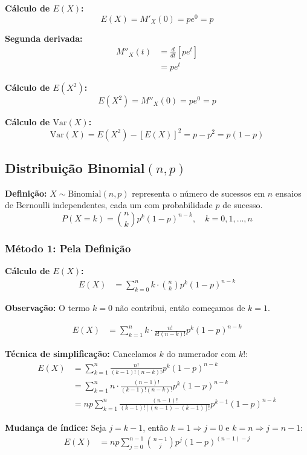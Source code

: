 \documentclass[12pt,a4paper]{article}
\theoremstyle{plain}
\theoremstyle{definition}
\theoremstyle{remark}
\begin{document}
\textbf{Cálculo de \(E(X)\):}
\[
E(X) = M'_X(0) = p e^0 = p
\]

\textbf{Segunda derivada:}
\begin{align}
M''_X(t) &= \frac{d}{dt}[p e^t] \\
&= p e^t
\end{align}

\textbf{Cálculo de \(E(X^2)\):}
\[
E(X^2) = M''_X(0) = p e^0 = p
\]

\textbf{Cálculo de \(\text{Var}(X)\):}
\[
\text{Var}(X) = E(X^2) - [E(X)]^2 = p - p^2 = p(1-p)
\]

\subsection{Distribuição Binomial\((n, p)\)}

\textbf{Definição:} \(X \sim \text{Binomial}(n, p)\) representa o número de sucessos em \(n\) ensaios de Bernoulli independentes, cada um com probabilidade \(p\) de sucesso.
\[
P(X = k) = \binom{n}{k} p^k (1-p)^{n-k}, \quad k = 0, 1, \ldots, n
\]

\subsubsection{Método 1: Pela Definição}

\textbf{Cálculo de \(E(X)\):}
\begin{align}
E(X) &= \sum_{k=0}^{n} k \cdot \binom{n}{k} p^k (1-p)^{n-k}
\end{align}

\textbf{Observação:} O termo \(k=0\) não contribui, então começamos de \(k=1\).

\begin{align}
E(X) &= \sum_{k=1}^{n} k \cdot \frac{n!}{k!(n-k)!} p^k (1-p)^{n-k}
\end{align}

\textbf{Técnica de simplificação:} Cancelamos \(k\) do numerador com \(k!\):
\begin{align}
E(X) &= \sum_{k=1}^{n} \frac{n!}{(k-1)!(n-k)!} p^k (1-p)^{n-k} \\
&= \sum_{k=1}^{n} n \cdot \frac{(n-1)!}{(k-1)!(n-k)!} p^k (1-p)^{n-k} \\
&= np \sum_{k=1}^{n} \frac{(n-1)!}{(k-1)![(n-1)-(k-1)]!} p^{k-1} (1-p)^{n-k}
\end{align}

\textbf{Mudança de índice:} Seja \(j = k-1\), então \(k=1 \Rightarrow j=0\) e \(k=n \Rightarrow j=n-1\):
\begin{align}
E(X) &= np \sum_{j=0}^{n-1} \binom{n-1}{j} p^j (1-p)^{(n-1)-j}
\end{align}
\end{document}

